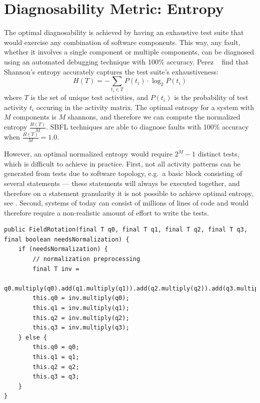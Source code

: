 \documentclass[twoside,a4paper,11pt]{memoir}
\begin{document}
\section{Diagnosability Metric: Entropy}
The optimal diagnosability is achieved by having an exhaustive test suite that would exercise any combination of software components.
This way, any fault, whether it involves a single component or multiple components, can be diagnosed using an automated debugging technique with 100\% accuracy.
Perez \etal~\cite{DBLP:conf/icse/PerezAD17} find that Shannon's entropy accurately captures the test suite's exhaustiveness:
\begin{equation}
  H(T) = - \sum_{t_i \in T} P(t_i) \cdot \log_2 P(t_i)
\end{equation}
where \(T \) is the set of unique test activities, and \(P(t_i) \) is the probability of test activity \(t_i \) occuring in the activity matrix.
The optimal entropy for a system with \(M \) components is \(M \) shannons, and therefore we can compute the normalized entropy \(\frac{H(T)}{M} \).
SBFL techniques are able to diagnose faults with 100\% accuracy when \(\frac{H(T)}{M} = 1.0 \).

However, an optimal normalized entropy would require \(2^M -1 \) distinct tests, which is difficult to achieve in practice.
First, not all activity patterns can be generated from tests due to software topology, e.g.\ a basic block consisting of several statements --- these statements will always be executed together, and therefore on a statement granularity it is not possible to achieve optimal entropy, see .
Second, systems of today can consist of millions of lines of code and would therefore require a non-realistic amount of effort to write the tests.\\
\begin{minipage}{\linewidth}
\begin{lstlisting}[caption={Lines 4 - 9 will always be executed together and therefore no optimal entropy can be achieved on a statement granularity. The same holds for lines 11 - 14.},label={lst:topology}]
public FieldRotation(final T q0, final T q1, final T q2, final T q3, final boolean needsNormalization) {
    if (needsNormalization) {
        // normalization preprocessing
        final T inv =
                q0.multiply(q0).add(q1.multiply(q1)).add(q2.multiply(q2)).add(q3.multiply(q3)).sqrt().reciprocal();
        this.q0 = inv.multiply(q0);
        this.q1 = inv.multiply(q1);
        this.q2 = inv.multiply(q2);
        this.q3 = inv.multiply(q3);
    } else {
        this.q0 = q0;
        this.q1 = q1;
        this.q2 = q2;
        this.q3 = q3;
    }
}
\end{lstlisting}
\end{minipage}
\end{document}
